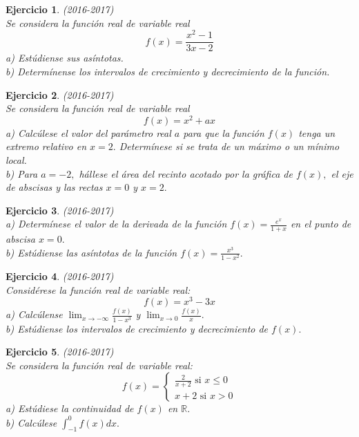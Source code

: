 \documentclass[12pt, a4paper]{amsart}
\newtheorem{ejer}{Ejercicio}
\begin{document}
\begin{ejer}\em (2016-2017)\\
Se considera la función real de variable real
\[f(x)=\frac{x^2-1}{3x-2}\]
a) Estúdiense sus asíntotas.\\
b) Determínense los intervalos de crecimiento y decrecimiento de la función.
\end{ejer}

\begin{ejer}\em (2016-2017)\\
Se considera la función real de variable real
\[f(x)=x^2+ax\]
a) Calcúlese el valor del parámetro real $a$ para que la función $f (x)$ tenga un extremo relativo en $x = 2.$ Determínese si se trata de un máximo o un mínimo local.\\
b) Para $a = - 2,$ hállese el área del recinto acotado por la gráfica de $f(x),$ el eje de abscisas y las rectas $x = 0$ y $x = 2.$
\end{ejer}

\begin{ejer}\em (2016-2017)\\
a) Determínese el valor de la derivada de la función $f (x) =\frac{e^x}{1+x}$ en el punto de abscisa $x=0.$\\
b) Estúdiense las asíntotas de la función $f (x) =\frac{x^3}{1-x^2}.$
\end{ejer}

\begin{ejer}\em (2016-2017)\\
Considérese la función real de variable real:
\[f(x)=x^3-3x\]
a) Calcúlense $\lim_{x\to -\infty}\frac{f(x)}{1-x^3}$ y $\lim_{x\to 0} \frac{f(x)}{x}.$\\
b) Estúdiense los intervalos de crecimiento y decrecimiento de $f (x).$
\end{ejer}

\begin{ejer}\em (2016-2017)\\
Se considera la función real de variable real:
\[f(x)=\left \{ \begin{matrix}
\frac{2}{x+2} \text{ si } x\leq 0\\
x+2\text{ si } x>0
\end{matrix}\right.\]
a) Estúdiese la continuidad de $f (x)$ en $\mathbb{R}.$\\
b) Calcúlese $\int_{-1}^0f(x)dx.$
\end{ejer}
\end{document}
